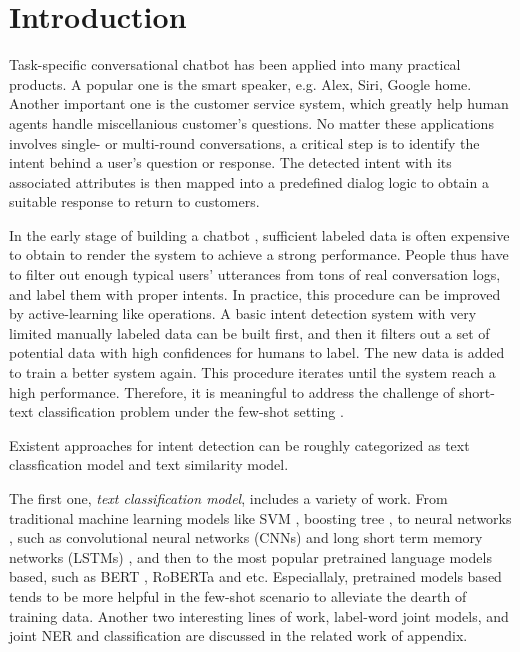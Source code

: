 \section{Introduction}
\label{sec:intro}

Task-specific conversational chatbot \cite{wen2016network} has been applied into many practical products. 
A popular one is the smart speaker, e.g. Alex, Siri, Google home. 
Another important one is the customer service system, which greatly help human agents handle miscellanious customer's questions.
No matter these applications involves single- or multi-round conversations, a critical step is to identify the intent behind a user's question or response. 
The detected intent with its associated attributes is then mapped into a predefined dialog logic to obtain a suitable response to return to customers.

In the early stage of building a chatbot , sufficient labeled data is often expensive to obtain to render the system to achieve a strong performance.
People thus have to filter out enough typical users' utterances from tons of real conversation logs, and label them with proper intents. 
In practice, this procedure can be improved by active-learning like operations. 
A basic intent detection system with very limited manually labeled data can be built first, and then it filters out a set of potential data with high confidences for humans to label.
The new data is added to train a better system again. 
This procedure iterates until the system reach a high performance.
Therefore, it is meaningful to address the challenge of short-text classification \cite{sriram2010short, chen2019deep, phan2008learning,yan2009dynamic,hua2015short} problem under the few-shot setting \cite{yu2018diverse}.

Existent approaches for intent detection can be roughly categorized as text classfication model and text similarity model.

The first one, \emph{text classification model}, includes a variety of work.
From traditional machine learning models like SVM \cite{suykens1999least}, boosting tree \cite{tu2005probabilistic}, to neural networks \cite{wen2016network}, such as convolutional neural networks (CNNs) \cite{kim2014convolutional,zhang2015character,conneau2016very} and long short term memory networks (LSTMs) \cite{mousa2017contextual,liu2016recurrent}, and then to the most popular pretrained language models based, such as BERT \cite{devlin2018bert}, RoBERTa \cite{liu2019roberta} and etc. 
Especiallaly, pretrained models based \cite{vaswani2017attention} tends to be more helpful in the few-shot scenario \cite{yu2018diverse, madabushi2020cost} to alleviate the dearth of training data.
Another two interesting lines of work, label-word joint models, and joint NER and classification are discussed in the related work of appendix.

